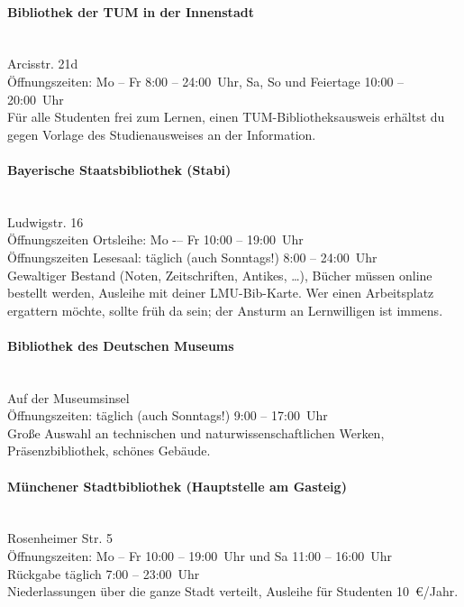 \paragraph{Bibliothek der TUM in der Innenstadt}\hfill\\
Arcisstr. 21d\\
Öffnungszeiten: Mo -- Fr 8:00 -- 24:00~Uhr, Sa, So und Feiertage 10:00 -- 20:00~Uhr\\
Für alle Studenten frei zum Lernen, einen TUM-Bibliotheksausweis erhältst du gegen Vorlage des Studienausweises an der Information.
\begin{urlList}
\end{urlList}

\paragraph{Bayerische Staatsbibliothek (Stabi)}\hfill\\
Ludwigstr. 16\\
Öffnungszeiten Ortsleihe: Mo -– Fr 10:00 -- 19:00~Uhr\\
Öffnungszeiten Lesesaal: täglich (auch Sonntags!) 8:00 -- 24:00~Uhr\\
Gewaltiger Bestand (Noten, Zeitschriften, Antikes, \ldots), Bücher
müssen online bestellt werden, Ausleihe mit deiner LMU-Bib-Karte. Wer
einen Arbeitsplatz ergattern möchte, sollte früh da sein; der
Ansturm an Lernwilligen ist immens.
\begin{urlList}
\end{urlList}

\paragraph{Bibliothek des Deutschen Museums}\hfill\\
Auf der Museumsinsel\\
Öffnungszeiten: täglich (auch Sonntags!) 9:00 -- 17:00~Uhr\\
Große Auswahl an technischen und naturwissenschaftlichen Werken, Präsenzbibliothek, schönes Gebäude.
\begin{urlList}
\end{urlList}

\paragraph{Münchener Stadtbibliothek (Hauptstelle am Gasteig)}\hfill\\
Rosenheimer Str. 5\\
Öffnungszeiten: Mo -- Fr 10:00 -- 19:00~Uhr und Sa 11:00 -- 16:00~Uhr\\
Rückgabe täglich 7:00 -- 23:00~Uhr\\
Niederlassungen über die ganze Stadt verteilt, Ausleihe für Studenten 10~€/Jahr.
\begin{urlList}
\end{urlList}
